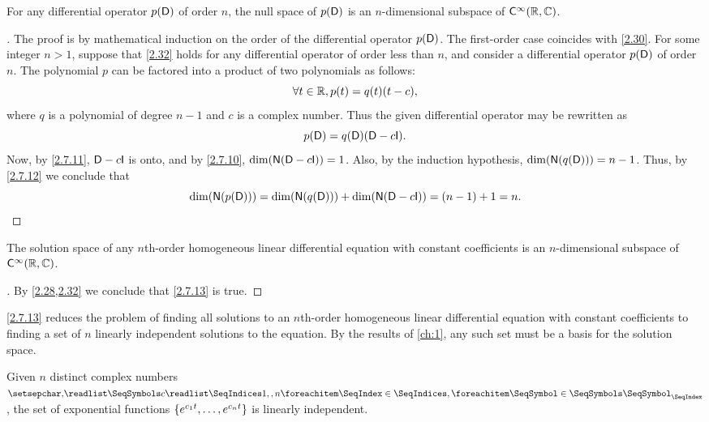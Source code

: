 \begin{thm}\label{2.32}
  For any differential operator \(p(\mathsf{D})\) of order \(n\), the null space of \(p(\mathsf{D})\) is an \(n\)-dimensional subspace of \(\cfs[\infty](\R, \C)\).
\end{thm}

\begin{proof}[]
  The proof is by mathematical induction on the order of the differential operator \(p(\mathsf{D})\).
  The first-order case coincides with \cref{2.30}.
  For some integer \(n > 1\), suppose that \cref{2.32} holds for any differential operator of order less than \(n\), and consider a differential operator \(p(\mathsf{D})\) of order \(n\).
  The polynomial \(p\) can be factored into a product of two polynomials as follows:
  \[
    \forall t \in \mathbb{R}, p(t) = q(t) (t - c),
  \]
  where \(q\) is a polynomial of degree \(n - 1\) and \(c\) is a complex number.
  Thus the given differential operator may be rewritten as
  \[
    p(\Dop) = q(\Dop) (\Dop - c \IT).
  \]
  Now, by \cref{2.7.11}, \(\Dop - c \IT\) is onto, and by \cref{2.7.10}, \(\dim(\ns{\Dop - c \IT}) = 1\).
  Also, by the induction hypothesis, \(\dim(\ns{q(\Dop)}) = n - 1\).
  Thus, by \cref{2.7.12} we conclude that
  \[
    \dim(\ns{p(\Dop)}) = \dim(\ns{q(\Dop)}) + \dim(\ns{\Dop - c \IT}) = (n - 1) + 1 = n.
  \]
\end{proof}

\begin{cor}\label{2.7.13}
  The solution space of any \(n\)th-order homogeneous linear differential equation with constant coefficients is an \(n\)-dimensional subspace of \(\cfs[\infty](\R, \C)\).
\end{cor}

\begin{proof}[]
  By \cref{2.28,2.32} we conclude that \cref{2.7.13} is true.
\end{proof}

\begin{note}
  \cref{2.7.13} reduces the problem of finding all solutions to an \(n\)th-order homogeneous linear differential equation with constant coefficients to finding a set of \(n\) linearly independent solutions to the equation.
  By the results of \cref{ch:1}, any such set must be a basis for the solution space.
\end{note}

\begin{thm}\label{2.33}
  Given \(n\) distinct complex numbers \(\seq{c}{1,,n}\), the set of exponential functions \(\left\lbrace e^{c_1 t}, \dots, e^{c_n t}\right\rbrace\) is linearly independent.
\end{thm}


